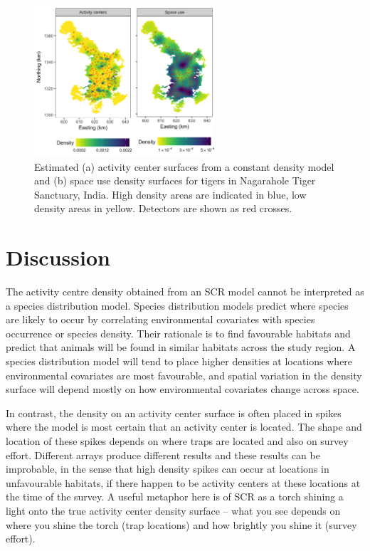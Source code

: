 \documentclass[a4paper,12pt]{article}
\begin{document}
\begin{figure}[htbp]
\centering
\includegraphics[width=0.6\textwidth]{tiger_spaceuse.png}
\caption{Estimated (a) activity center surfaces from a constant density model and (b) space use density surfaces for tigers in Nagarahole Tiger Sanctuary, India. High density areas are indicated in blue, low density areas in yellow. Detectors are shown as red crosses.}
\label{tigerspaceuse}
\end{figure}


\section{Discussion}
The activity centre density obtained from an SCR model cannot be interpreted as a species distribution model. Species distribution models predict where species are likely to occur by correlating environmental covariates with species occurrence or species density. Their rationale is to find favourable habitats and predict that animals will be found in similar habitats across the study region. A species distribution model will tend to place higher densities at locations where environmental covariates are most favourable, and spatial variation in the density surface will depend mostly on how environmental covariates change across space.

In contrast, the density on an activity center surface is often placed in spikes where the model is most certain that an activity center is located. The shape and location of these spikes depends on where traps are located and also on survey effort. Different arrays produce different results and these results can be improbable, in the sense that high density spikes can occur at locations in unfavourable habitats, if there happen to be activity centers at these locations at the time of the survey. A useful metaphor here is of SCR as a torch shining a light onto the true activity center density surface -- what you see depends on where you shine the torch (trap locations) and how brightly you shine it (survey effort). 
\end{document}
